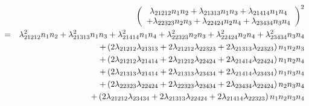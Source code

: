 \documentclass[12pt]{article}
\begin{document}
\begin{eqnarray}
&&\left( 
\begin{array}{c}
\lambda _{21212}n_{1}n_{2}+\lambda _{21313}n_{1}n_{3}+\lambda
_{21414}n_{1}n_{4} \\ 
+\lambda _{22323}n_{2}n_{3}+\lambda _{22424}n_{2}n_{4}+\lambda
_{23434}n_{3}n_{4}%
\end{array}%
\right) ^{2}  \notag \\
&=&\lambda _{21212}^{2}n_{1}n_{2}+\lambda _{21313}^{2}n_{1}n_{3}+\lambda
_{21414}^{2}n_{1}n_{4}+\lambda _{22323}^{2}n_{2}n_{3}+\lambda
_{22424}^{2}n_{2}n_{4}+\lambda _{23434}^{2}n_{3}n_{4}  \notag \\
&&+\left( 2\lambda _{21212}\lambda _{21313}+2\lambda _{21212}\lambda
_{22323}+2\lambda _{21313}\lambda _{22323}\right) n_{1}n_{2}n_{3}  \notag \\
&&+\left( 2\lambda _{21212}\lambda _{21414}+2\lambda _{21212}\lambda
_{22424}+2\lambda _{21414}\lambda _{22424}\right) n_{1}n_{2}n_{4}  \notag \\
&&+\left( 2\lambda _{21313}\lambda _{21414}+2\lambda _{21313}\lambda
_{23434}+2\lambda _{21414}\lambda _{23434}\right) n_{1}n_{3}n_{4}  \notag \\
&&+\left( 2\lambda _{22323}\lambda _{22424}+2\lambda _{22323}\lambda
_{23434}+2\lambda _{23434}\lambda _{22424}\right) n_{2}n_{3}n_{4}  \notag \\
&&+\left( 2\lambda _{21212}\lambda _{23434}+2\lambda _{21313}\lambda
_{22424}+2\lambda _{21414}\lambda _{22323}\right) n_{1}n_{2}n_{3}n_{4}
\end{eqnarray}
\end{document}
